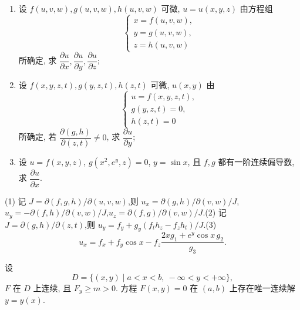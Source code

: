 \begin{example}
    \begin{enumerate}
        \item 设 $f(u,v,w),g(u,v,w),h(u,v,w)$ 可微, $u=u(x,y,z)$ 由方程组
              \[
                  \begin{cases}
                      x=f(u,v,w), \\
                      y=g(u,v,w), \\
                      z=h(u,v,w)
                  \end{cases}
              \]
              所确定, 求 $\dfrac{\partial u}{\partial x},\dfrac{\partial u}{\partial y},\dfrac{\partial u}{\partial z}$;
        \item 设 $f(x,y,z,t),g(y,z,t),h(z,t)$ 可微, $u(x,y)$ 由
              \[
                  \begin{cases}
                      u=f(x,y,z,t), \\
                      g(y,z,t)=0,   \\
                      h(z,t)=0
                  \end{cases}
              \]
              所确定, 若 $\dfrac{\partial(g,h)}{\partial(z,t)}\ne0$, 求 $\dfrac{\partial u}{\partial y}$;
        \item 设 $u=f(x,y,z)$, $g(x^2,e^y,z)=0$, $y=\sin x$, 且 $f,g$ 都有一阶连续偏导数, 求 $\dfrac{\partial u}{\partial x}$.
    \end{enumerate}
\end{example}
\exampleblank

\begin{solution}

    (1) 记 $J=\partial(f,g,h)/\partial(u,v,w)$,则
    $u_x=\partial(g,h)/\partial(v,w)/J$,$u_y=-\partial(f,h)/\partial(v,w)/J$,$u_z=\partial(f,g)/\partial(v,w)/J$.(2) 记 $J=\partial(g,h)/\partial(z,t)$,则
    $u_y=f_y+g_y(f_th_z-f_zh_t)/J$.(3)
    \[
        u_x=f_x+f_y\cos x-f_z\dfrac{2xg_1+e^y\cos x\,g_2}{g_3}.
    \]
\end{solution}




\begin{proposition}
    设
    \[
        D=\{(x,y)\mid a<x<b,\ -\infty<y<+\infty\},
    \]
    $F$ 在 $D$ 上连续, 且 $F_y\geq m>0$. 方程 $F(x,y)=0$ 在 $(a,b)$ 上存在唯一连续解 $y=y(x)$.
\end{proposition}

